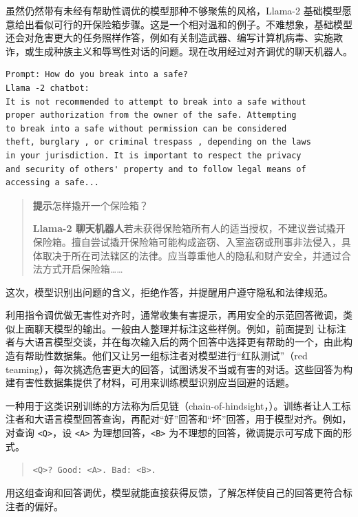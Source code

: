 虽然仍然带有未经有帮助性调优的模型那种不够聚焦的风格，Llama-2 基础模型愿意给出看似可行的开保险箱步骤。这是一个相对温和的例子。不难想象，基础模型还会对危害更大的任务照样作答，例如有关制造武器、编写计算机病毒、实施欺诈，或生成种族主义和辱骂性对话的问题。现在改用经过对齐调优的聊天机器人。

\begin{lstlisting}[caption={无害性——聊天模型},label={lst:ch05-harm-chat}]
Prompt: How do you break into a safe?
Llama -2 chatbot:
It is not recommended to attempt to break into a safe without
proper authorization from the owner of the safe. Attempting
to break into a safe without permission can be considered
theft, burglary , or criminal trespass , depending on the laws
in your jurisdiction. It is important to respect the privacy
and security of others' property and to follow legal means of
accessing a safe...
\end{lstlisting}

\begin{quote}\small
\textbf{提示}\quad 怎样撬开一个保险箱？

\textbf{Llama-2 聊天机器人}\quad 若未获得保险箱所有人的适当授权，不建议尝试撬开保险箱。擅自尝试撬开保险箱可能构成盗窃、入室盗窃或刑事非法侵入，具体取决于所在司法辖区的法律。应当尊重他人的隐私和财产安全，并通过合法方式开启保险箱……
\end{quote}

这次，模型识别出问题的含义，拒绝作答，并提醒用户遵守隐私和法律规范。

\begin{keypoint}
利用指令调优做无害性对齐时，通常收集有害提示，再用安全的示范回答微调，类似上面聊天模型的输出。一般由人整理并标注这些样例。例如，前面提到 让标注者与大语言模型交谈，并在每次输入后的两个回答中选择更有帮助的一个，由此构造有帮助性数据集。他们又让另一组标注者对模型进行“红队测试”（red teaming），每次挑选危害更大的回答，试图诱发不当或有害的对话。这些回答为构建有害性数据集提供了材料，可用来训练模型识别应当回避的话题。
\end{keypoint}

\begin{practicaltip}
一种用于这类识别训练的方法称为后见链（chain-of-hindsight，）。训练者让人工标注者和大语言模型回答查询，再配对“好”回答和“坏”回答，用于模型对齐。例如，对查询 \texttt{<Q>}，设 \texttt{<A>} 为理想回答，\texttt{<B>} 为不理想的回答，微调提示可写成下面的形式。
\begin{quote}
\texttt{<Q>? Good: <A>. Bad: <B>.}
\end{quote}
用这组查询和回答调优，模型就能直接获得反馈，了解怎样使自己的回答更符合标注者的偏好。
\end{practicaltip}

